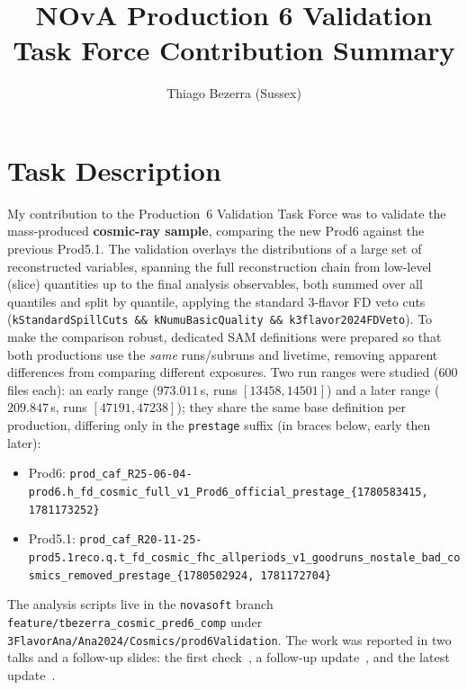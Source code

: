 \documentclass{article}
\title{NOvA Production 6 Validation Task Force Contribution Summary}
\author{Thiago Bezerra (Sussex)}
\begin{document}
\maketitle

\section{Task Description}

My contribution to the Production~6 Validation Task Force was to validate the
mass-produced \textbf{cosmic-ray sample}, comparing the new Prod6 against the
previous Prod5.1. The validation overlays the distributions of a large set of
reconstructed variables, spanning the full reconstruction chain from low-level
(slice) quantities up to the final analysis observables, both summed over all
quantiles and split by quantile, applying the standard 3-flavor FD veto cuts
(\texttt{kStandardSpillCuts \&\& kNumuBasicQuality \&\& k3flavor2024FDVeto}).
To make the comparison robust, dedicated SAM definitions were prepared so that
both productions use the \emph{same} runs/subruns and livetime, removing apparent
differences from comparing different exposures. Two run ranges were studied (600
files each): an early range ($973.011$\,s, runs $[13458, 14501]$) and a later range
($209.847$\,s, runs $[47191, 47238]$); they share the same base definition per
production, differing only in the \texttt{prestage} suffix (in braces below, early
then later):
{\footnotesize
\begin{itemize}
  \setlength{\itemsep}{1pt}
  \item Prod6:
  \texttt{prod\_\allowbreak caf\_\allowbreak R25-06-04-prod6.h\_\allowbreak fd\_\allowbreak cosmic\_\allowbreak full\_\allowbreak v1\_\allowbreak Prod6\_\allowbreak official\_\allowbreak prestage\_\allowbreak \{1780583415,\,1781173252\}}
  \item Prod5.1:
  \texttt{prod\_\allowbreak caf\_\allowbreak R20-11-25-prod5.1reco.q.t\_\allowbreak fd\_\allowbreak cosmic\_\allowbreak fhc\_\allowbreak allperiods\_\allowbreak v1\_\allowbreak goodruns\_\allowbreak nostale\_\allowbreak bad\_\allowbreak cosmics\_\allowbreak removed\_\allowbreak prestage\_\allowbreak \{1780502924,\,1781172704\}}
\end{itemize}
}
The analysis scripts live in the \texttt{novasoft}
branch \texttt{feature/tbezerra\_cosmic\_pred6\_comp} under
\texttt{3FlavorAna/\allowbreak Ana2024/\allowbreak Cosmics/\allowbreak prod6Validation}.
The work was reported in two talks and a follow-up slides: the first check~\cite{docdb-69724},
a follow-up update~\cite{docdb-70051}, and the latest update~\cite{docdb-70174}.
\end{document}
